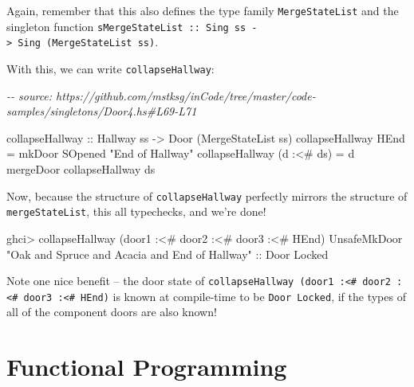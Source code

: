 \documentclass[]{article}
\newenvironment{Shaded}{}{}
\newcommand{\CommentTok}[1]{\textcolor[rgb]{0.38,0.63,0.69}{\textit{#1}}}
\newcommand{\DataTypeTok}[1]{\textcolor[rgb]{0.56,0.13,0.00}{#1}}
\newcommand{\NormalTok}[1]{#1}
\newcommand{\OperatorTok}[1]{\textcolor[rgb]{0.40,0.40,0.40}{#1}}
\newcommand{\OtherTok}[1]{\textcolor[rgb]{0.00,0.44,0.13}{#1}}
\newcommand{\StringTok}[1]{\textcolor[rgb]{0.25,0.44,0.63}{#1}}
\begin{document}
Again, remember that this also defines the type family \texttt{MergeStateList}
and the singleton function
\texttt{sMergeStateList\ ::\ Sing\ ss\ -\textgreater{}\ Sing\ (MergeStateList\ ss)}.

With this, we can write \texttt{collapseHallway}:

\begin{Shaded}
\begin{Highlighting}[]
\CommentTok{{-}{-} source: https://github.com/mstksg/inCode/tree/master/code{-}samples/singletons/Door4.hs\#L69{-}L71}

\OtherTok{collapseHallway ::} \DataTypeTok{Hallway}\NormalTok{ ss }\OtherTok{{-}\textgreater{}} \DataTypeTok{Door}\NormalTok{ (}\DataTypeTok{MergeStateList}\NormalTok{ ss)}
\NormalTok{collapseHallway }\DataTypeTok{HEnd}       \OtherTok{=}\NormalTok{ mkDoor }\DataTypeTok{SOpened} \StringTok{"End of Hallway"}
\NormalTok{collapseHallway (d }\OperatorTok{:\textless{}\#}\NormalTok{ ds) }\OtherTok{=}\NormalTok{ d }\OtherTok{\textasciigrave{}mergeDoor\textasciigrave{}}\NormalTok{ collapseHallway ds}
\end{Highlighting}
\end{Shaded}

Now, because the structure of \texttt{collapseHallway} perfectly mirrors the
structure of \texttt{mergeStateList}, this all typechecks, and we're done!

\begin{Shaded}
\begin{Highlighting}[]
\NormalTok{ghci}\OperatorTok{\textgreater{}}\NormalTok{ collapseHallway (door1 }\OperatorTok{:\textless{}\#}\NormalTok{ door2 }\OperatorTok{:\textless{}\#}\NormalTok{ door3 }\OperatorTok{:\textless{}\#} \DataTypeTok{HEnd}\NormalTok{)}
\DataTypeTok{UnsafeMkDoor} \StringTok{"Oak and Spruce and Acacia and End of Hallway"}
\OtherTok{    ::} \DataTypeTok{Door} \DataTypeTok{\textquotesingle{}Locked}
\end{Highlighting}
\end{Shaded}

Note one nice benefit -- the door state of
\texttt{collapseHallway\ (door1\ :\textless{}\#\ door2\ :\textless{}\#\ door3\ :\textless{}\#\ HEnd)}
is known at compile-time to be \texttt{Door\ \textquotesingle{}Locked}, if the
types of all of the component doors are also known!

\section{Functional Programming}\label{functional-programming}
\end{document}

